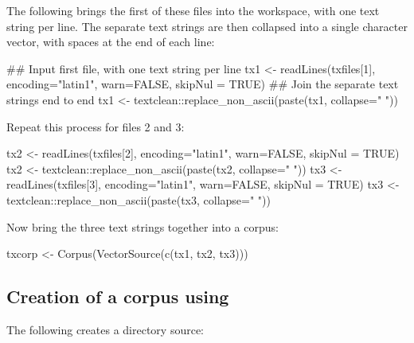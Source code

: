 The following brings the first of these files into the workspace,
with one text string per line. The separate text strings are then
collapsed into a single character vector, with spaces at the end
of each line:
\begin{fullwidth}
\begin{Schunk}
\begin{Sinput}
## Input first file, with one text string per line
tx1 <- readLines(txfiles[1], encoding="latin1", warn=FALSE, 
                 skipNul = TRUE)
## Join the separate text strings end to end
tx1 <- textclean::replace_non_ascii(paste(tx1, collapse=" "))
\end{Sinput}
\end{Schunk}
\end{fullwidth}

Repeat this process for files 2 and 3:
\begin{fullwidth}
\begin{Schunk}
\begin{Sinput}
tx2 <- readLines(txfiles[2], encoding="latin1", warn=FALSE, 
                 skipNul = TRUE)
tx2 <- textclean::replace_non_ascii(paste(tx2, collapse=" "))
tx3 <- readLines(txfiles[3], encoding="latin1", warn=FALSE, 
                 skipNul = TRUE)
tx3 <- textclean::replace_non_ascii(paste(tx3, collapse=" "))
\end{Sinput}
\end{Schunk}
\end{fullwidth}

Now bring the three text strings together into a corpus:
\begin{Schunk}
\begin{Sinput}
txcorp <- Corpus(VectorSource(c(tx1, tx2, tx3)))
\end{Sinput}
\end{Schunk}

\subsection*{Creation of a corpus using }

The following creates a directory source:
\begin{Schunk}
\end{Schunk}

